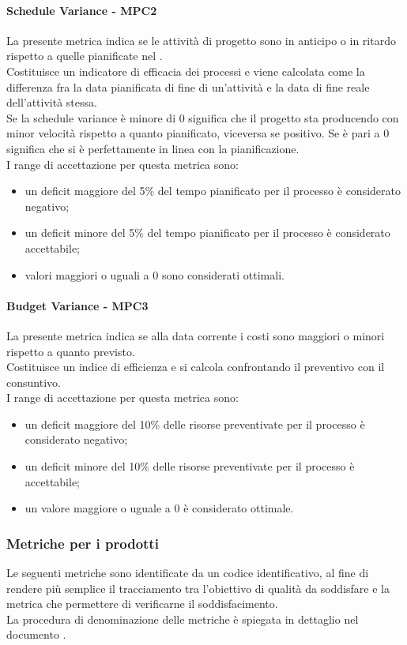 \documentclass[../PianoDiQualifica.tex]{subfiles}
\begin{document}
			\paragraph{Schedule Variance - MPC2}\label{MPC2}
			La presente metrica indica se le attività di progetto sono in anticipo o in ritardo rispetto a quelle pianificate nel \pianodiprogetto.\\
			Costituisce un indicatore di efficacia dei processi e viene calcolata come la differenza fra la data pianificata di fine di un'attività e la data di fine reale dell'attività stessa.\\
			Se la schedule variance è minore di 0 significa che il progetto sta producendo con minor velocità rispetto a quanto pianificato, viceversa se positivo. Se è pari a 0 significa che si è perfettamente in linea con la pianificazione.\\
			I range di accettazione per questa metrica sono:
			\begin{itemize}
				\item un deficit maggiore del 5\% del tempo pianificato per il processo è considerato negativo;
				\item un deficit minore del 5\% del tempo pianificato per il processo è considerato accettabile;
				\item valori maggiori o uguali a 0 sono considerati ottimali.
			\end{itemize}
					
			\paragraph{Budget Variance - MPC3}\label{MPC3}
			La presente metrica indica se alla data corrente i costi sono maggiori o minori rispetto a quanto previsto.\\
			Costituisce un indice di efficienza e si calcola confrontando il preventivo con il consuntivo.\\
			I range di accettazione per questa metrica sono:
			\begin{itemize}
				\item un deficit maggiore del 10\% delle risorse preventivate per il processo è considerato negativo;
				\item un deficit minore del 10\% delle risorse preventivate per il processo è accettabile;
				\item un valore maggiore o uguale a 0 è considerato ottimale.
			\end{itemize}
			
			\subsubsection{Metriche per i prodotti}
			Le seguenti metriche sono identificate da un codice identificativo, al fine di rendere più semplice il tracciamento tra l'obiettivo di qualità da soddisfare e la metrica che permettere di verificarne il soddisfacimento.\\
			La procedura di denominazione delle metriche è spiegata in dettaglio nel documento \normediprogettov.
			
\end{document}
